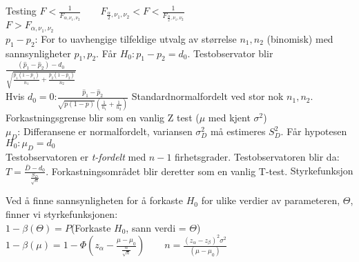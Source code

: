 \documentclass[final,hyperref={pdfpagelabels=false}]{beamer}
\begin{document}
\begin{frame}{}
\begin{columns}[t]
\begin{column}{.25\linewidth}
\begin{block}{\center\normalsize Testing}
{					$F<\frac{1}{F_{\alpha,\nu_1,\nu_2}} \qquad F_{\frac{\alpha}{2},\nu_1,\nu_2} < F < \frac{1}{F_{\frac{\alpha}{2},\nu_1,\nu_2}} $\\$ F > F_{\alpha,\nu_1,\nu_2}$\\
					$p_1-p_2$: For to uavhengige tilfeldige utvalg av størrelse $n_1,n_2$ (binomisk) med sannsynligheter $p_1,p_2$. Får $H_0:p_1-p_2=d_0$. Testobservator blir\\
					$\frac{(\hat p_1 - \hat p_2)-d_0}{\sqrt{\frac{\hat p_1(1-\hat p_1)}{n_1}+\frac{\hat p_2 (1-\hat p_2)}{n_2}}}$ \\Hvis $d_0=0$:$\frac{\hat p_1 - \hat p_2}{\sqrt{p(1-p)}\left(\frac{1}{n_1}+\frac{1}{n_2}\right)}$ Standardnormalfordelt ved stor nok $n_1,n_2$. Forkastningsgrense blir som en vanlig Z test ($\mu$ med kjent $\sigma^2$)\\
					$\mu_D$: Differansene er normalfordelt, variansen $\sigma_D^2$ må estimeres $S_D^2$. Får hypotesen $H_0:\mu_D=d_0$\\
					Testobservatoren er \textit{t-fordelt} med $n-1$ firhetsgrader. Testobservatoren blir da: $T=\frac{\bar D - d_0}{\frac{S_D}{\sqrt n}}$. Forkastningsområdet blir deretter som en vanlig T-test.
				}
				\center\normalsize Styrkefunksjon\\
				{\footnotesize\raggedright
					Ved å finne sannsynligheten for å forkaste $H_0$ for ulike verdier av parameteren, $\Theta$, finner vi styrkefunksjonen:\\
					$1-\beta(\Theta)=P$(Forkaste $H_0$, sann verdi = $\Theta$)
					$1-\beta(\mu)=1-\Phi\left(z_\alpha-\frac{\mu-\mu_0}{\frac{\alpha}{\sqrt n}}\right) \qquad n=\frac{(z_\alpha-z_\beta)^2\sigma^2}{(\mu-\mu_0)}$
				}
			\end{block}
		\end{column}
	\end{columns}
\end{frame}
\end{document}
